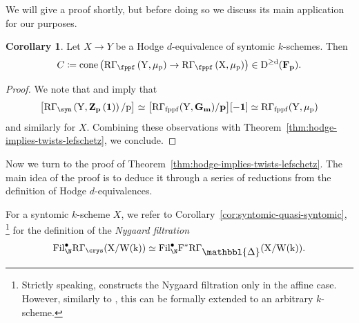 \documentclass[11pt,reqno]{amsart}
\newcommand{\Prism}{{\mathlarger{\mathbbl{\Delta}}}}
\numberwithin{equation}{section}
\theoremstyle{definition}
\newtheorem{cor}[thm]{Corollary}
\begin{document}
We will give a proof shortly, but before doing so we discuss its main application for our purposes. 

\begin{cor}\label{cor:lefschetz-flat-mu_p} Let $X \to Y$ be a Hodge $d$-equivalence of syntomic $k$-schemes. Then 
\[
C \coloneqq \rm{cone}\left(\rm{R}\Gamma_\fppf\left(Y, \mu_p\right) \to \rm{R}\Gamma_\fppf\left(X, \mu_p\right)\right) \in D^{\geq d}(\bf{F}_p).
\]
\end{cor}
\begin{proof}
    We note that \cite[Prop.~7.5.6]{Bhatt-Lurie} and \cite[Th.~11.7]{Brauer_3} imply that 
    \[
    \big[\rm{R}\Gamma_\syn\left(Y, \bf{Z}_p\left(1\right)\right)/p\big]  \simeq \big[\rm{R}\Gamma_{\rm{fppf}}(Y, \bf{G}_m)/p\big][-1] \simeq \rm{R}\Gamma_{\rm{fppf}}(Y, \mu_p)
    \]
    and similarly for $X$. Combining these observations with Theorem~\ref{thm:hodge-implies-twists-lefschetz}, we conclude. 
\end{proof}

Now we turn to the proof of Theorem~\ref{thm:hodge-implies-twists-lefschetz}. The main idea of the proof is to deduce it through a series of reductions from the definition of Hodge $d$-equivalences. \smallskip

For a syntomic $k$-scheme $X$, we refer to Corollary~\ref{cor:syntomic-quasi-syntomic}, \cite[Warning 4.6.2, Prop.~5.1.1]{Bhatt-Lurie}\footnote{Strictly speaking, \cite[Prop.~5.1.1]{Bhatt-Lurie} constructs the Nygaard filtration only in the affine case. However, similarly to \cite[Not.~5.5.23]{Bhatt-Lurie}, this can be formally extended to an arbitrary $k$-scheme.} for the definition of the {\it Nygaard filtration} 
\[
\rm{Fil}_\N^\bullet \rm{R}\Gamma_\crys(X/W(k)) \simeq \rm{Fil}_\N^\bullet F^*\rm{R}\Gamma_{\Prism}(X/W(k)).
\]
\end{document}
